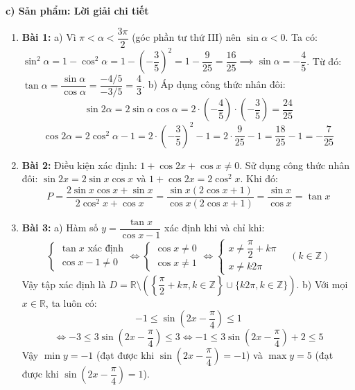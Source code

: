 \documentclass[12pt, a4paper]{article}
\begin{document}
\noindent \textbf{c) Sản phẩm: Lời giải chi tiết}  
\begin{enumerate}[leftmargin=0.6cm]  
    \item \textbf{Bài 1:}  
    a) Vì $\pi < \alpha < \dfrac{3\pi}{2}$ (góc phần tư thứ III) nên $\sin\alpha < 0$.  
    Ta có: $\sin^2\alpha = 1 - \cos^2\alpha = 1 - \left(-\dfrac{3}{5}\right)^2 = 1 - \dfrac{9}{25} = \dfrac{16}{25} \implies \sin\alpha = -\dfrac{4}{5}$.  
    Từ đó: $\tan\alpha = \dfrac{\sin\alpha}{\cos\alpha} = \dfrac{-4/5}{-3/5} = \dfrac{4}{3}$.  
    b) Áp dụng công thức nhân đôi:  
    $$\sin 2\alpha = 2\sin\alpha \cos\alpha = 2 \cdot \left(-\dfrac{4}{5}\right) \cdot \left(-\dfrac{3}{5}\right) = \dfrac{24}{25}$$  
    $$\cos 2\alpha = 2\cos^2\alpha - 1 = 2 \cdot \left(-\dfrac{3}{5}\right)^2 - 1 = 2 \cdot \dfrac{9}{25} - 1 = \dfrac{18}{25} - 1 = -\dfrac{7}{25}$$  
  
    \item \textbf{Bài 2:}  
    Điều kiện xác định: $1 + \cos 2x + \cos x \neq 0$.  
    Sử dụng công thức nhân đôi: $\sin 2x = 2\sin x \cos x$ và $1 + \cos 2x = 2\cos^2 x$.  
    Khi đó:  
    $$P = \dfrac{2\sin x \cos x + \sin x}{2\cos^2 x + \cos x} = \dfrac{\sin x(2\cos x + 1)}{\cos x(2\cos x + 1)} = \dfrac{\sin x}{\cos x} = \tan x$$  
  
    \item \textbf{Bài 3:}  
    a) Hàm số $y = \dfrac{\tan x}{\cos x - 1}$ xác định khi và chỉ khi:  
    $$\begin{cases} \tan x \text{ xác định} \\ \cos x - 1 \neq 0 \end{cases} \iff \begin{cases} \cos x \neq 0 \\ \cos x \neq 1 \end{cases} \iff \begin{cases} x \neq \dfrac{\pi}{2} + k\pi \\ x \neq k2\pi \end{cases} \quad (k \in \mathbb{Z})$$  
    Vậy tập xác định là $D = \mathbb{R} \setminus \left(\left\{\dfrac{\pi}{2} + k\pi, k \in \mathbb{Z}\right\} \cup \{k2\pi, k \in \mathbb{Z}\}\right)$.  
    b) Với mọi $x \in \mathbb{R}$, ta luôn có:  
    $$-1 \le \sin\left(2x - \dfrac{\pi}{4}\right) \le 1$$  
    $$\iff -3 \le 3\sin\left(2x - \dfrac{\pi}{4}\right) \le 3 \iff -1 \le 3\sin\left(2x - \dfrac{\pi}{4}\right) + 2 \le 5$$  
    Vậy $\min y = -1$ (đạt được khi $\sin\left(2x - \dfrac{\pi}{4}\right) = -1$) và $\max y = 5$ (đạt được khi $\sin\left(2x - \dfrac{\pi}{4}\right) = 1$).  
  

\end{enumerate}
\end{document}
